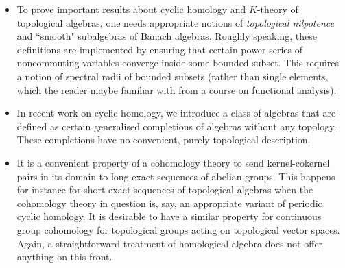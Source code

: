 \begin{itemize}
\item To prove important results about cyclic homology and \(K\)-theory of topological algebras, one needs appropriate notions of \textit{topological nilpotence} and ``smooth" subalgebras of Banach algebras. Roughly speaking, these  definitions are implemented by ensuring that certain power series of noncommuting variables converge inside some bounded subset. This requires a notion of spectral radii of bounded subsets (rather than single elements, which the reader maybe familiar with from a course on functional analysis).

\item In recent work on cyclic homology, we introduce a class of algebras that are defined as certain generalised completions of algebras without any topology. These  completions have no convenient, purely topological description. 

\item It is a convenient property of a cohomology theory to send kernel-cokernel pairs in its domain to long-exact sequences of abelian groups. This happens for instance for short exact sequences of topological algebras when the cohomology theory in question is, say, an appropriate variant of periodic cyclic homology. It is desirable to have a similar property for continuous group cohomology for topological groups acting on topological vector spaces. Again, a straightforward treatment of homological algebra does not offer anything on this front.  
\end{itemize}